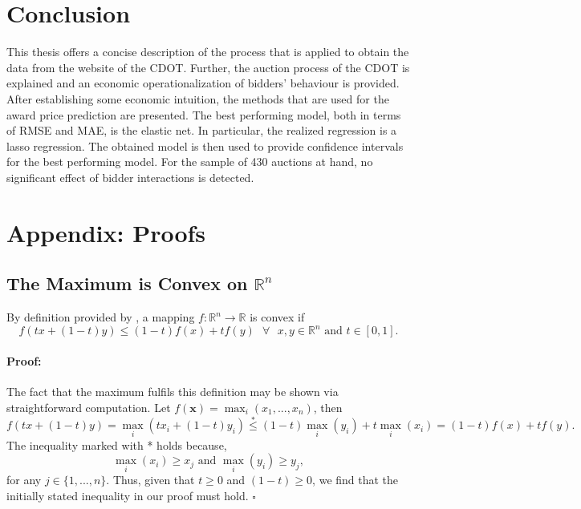 \documentclass[a4paper,12pt, headsepline]{scrartcl}
\DeclareMathOperator*{\maxA}{max}
\newenvironment{proof}{\paragraph{Proof:}}{\hfill$\square$}
\numberwithin{equation}{section}
\begin{document}
\section{Conclusion}\label{sec:con}
 This thesis offers a concise description of the process that is applied to obtain the data from the website of the CDOT. Further, the auction process of the CDOT is explained and an economic operationalization of bidders' behaviour is provided. After establishing some economic intuition, the methods that are used for the award price prediction are presented. The best performing model, both in terms of RMSE and MAE, is the elastic net. In particular, the realized regression is a lasso regression. The obtained model is then used to provide confidence intervals for the best performing model. For the sample of 430 auctions at hand, no significant effect of bidder interactions is detected.
 \newpage
 \printbibliography[heading=bibintoc]
 \newpage
 \appendix
 \section{Appendix: Proofs}
 \subsection{The Maximum is Convex on $\mathbb{R}^n$}\label{App:A1}
 By definition provided by \citet{rudin76}, a mapping $f: \mathbb{R}^n \rightarrow \mathbb{R}$ is convex if
 \[
 f(tx+ (1-t)y) \leq (1-t)f(x)+tf(y) \text{ }\forall\text{ } x, y \in \mathbb{R}^n \text{ and } t \in [0, 1].
 \]
 \begin{proof}
 The fact that the maximum fulfils this definition may be shown via straightforward computation. 
 Let $f(\bm{x}) = \maxA_i(x_1, ..., x_n)$, then 
 \[
  f(tx+ (1-t)y) = \maxA_i(tx_i + (1-t)y_i) \overset{*}{\leq} (1-t)\maxA_i(y_i) + t\maxA_i(x_i) = (1-t)f(x)+tf(y).
 \]
 The inequality marked with * holds because,
 \[
  \maxA_i(x_i) \geq x_j \text{ and } \maxA_i(y_i) \geq y_j,
 \]
for any $j \in \{1, ..., n\}$. Thus, given that $t \geq 0$ and $(1-t) \geq 0$, we find that the initially stated inequality in our proof must hold.
\end{proof}
\end{document}
